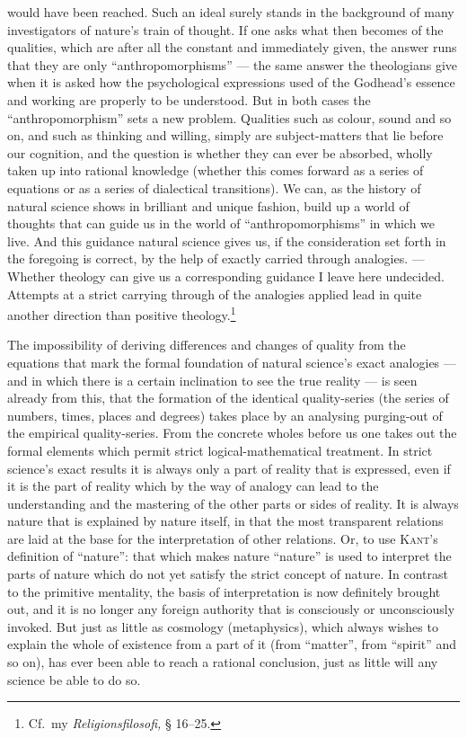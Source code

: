 \documentclass[12pt]{book}
\newcommand{\opage}[1]{\marginnote{\footnotesize\textit{[#1]}}}
\begin{document}
would have been reached. Such an ideal surely stands in the background of many
investigators of nature's train of thought. If one asks what then becomes of the
qualities, which are after all the constant and immediately given, the answer runs
that they are only ``anthropomorphisms'' --- the same answer the theologians give
when it is asked how the psychological expressions used of the Godhead's essence
and working are properly to be understood. But in both cases the
``anthropomorphism'' sets a new problem. Qualities such as colour, sound and so
on, and such as thinking and willing, simply are subject-matters that lie before
our cognition, and the question is whether they can ever be absorbed, wholly taken
up into rational knowledge (whether \opage{96}this comes forward as a series of equations or
as a series of dialectical transitions). We can, as the history of natural science
shows in brilliant and unique fashion, build up a world of thoughts that can guide
us in the world of ``anthropomorphisms'' in which we live. And this guidance
natural science gives us, if the consideration set forth in the foregoing is
correct, by the help of exactly carried through analogies. --- Whether theology
can give us a corresponding guidance I leave here undecided. Attempts at a strict
carrying through of the analogies applied lead in quite another direction than
positive theology.\footnote{Cf.\ my \textit{Religionsfilosofi,} § 16--25.}

The impossibility of deriving differences and changes of quality from the
equations that mark the formal foundation of natural science's exact analogies
--- and in which there is a certain inclination to see the true reality --- is
seen already from this, that the formation of the identical quality-series (the
series of numbers, times, places and degrees) takes place by an analysing
purging-out of the empirical quality-series. From the concrete wholes before us
one takes out the formal elements which permit strict logical-mathematical
treatment. In strict science's exact results it is always only a part of reality
that is expressed, even if it is the part of reality which by the way of analogy
can lead to the understanding and the mastering of the other parts or sides of
reality. It is always nature that is explained by nature itself, in that the most
transparent relations are laid at the base for the interpretation of other
relations. Or, to use \textsc{Kant}'s definition of ``nature'': that which makes
nature ``nature'' is used to interpret the parts of nature which do not yet
satisfy the strict concept of nature. In contrast to the \opage{97}primitive mentality, the
basis of interpretation is now definitely brought out, and it is no longer any
foreign authority that is consciously or unconsciously invoked. But just as
little as cosmology (metaphysics), which always wishes to explain the whole of
existence from a part of it (from ``matter'', from ``spirit'' and so on), has ever
been able to reach a rational conclusion, just as little will any science be able
to do so.
\end{document}
